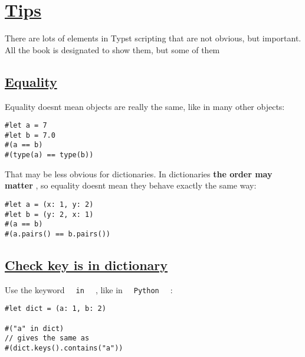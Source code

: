 \section{\texorpdfstring{\hyperref[tips]{Tips}}{Tips}}\label{tips}

There are lots of elements in Typst scripting that are not obvious, but
important. All the book is designated to show them, but some of them

\subsection{\texorpdfstring{\hyperref[equality]{Equality}}{Equality}}\label{equality}

Equality doesn\textquotesingle t mean objects are really the same, like
in many other objects:

\begin{verbatim}
#let a = 7
#let b = 7.0
#(a == b)
#(type(a) == type(b))
\end{verbatim}

\pandocbounded{}

That may be less obvious for dictionaries. In dictionaries \textbf{the
order may matter} , so equality doesn\textquotesingle t mean they behave
exactly the same way:

\begin{verbatim}
#let a = (x: 1, y: 2)
#let b = (y: 2, x: 1)
#(a == b)
#(a.pairs() == b.pairs())
\end{verbatim}

\pandocbounded{}

\subsection{\texorpdfstring{\hyperref[check-key-is-in-dictionary]{Check
key is in
dictionary}}{Check key is in dictionary}}\label{check-key-is-in-dictionary}

Use the keyword \texttt{\ }{\texttt{\ in\ }}\texttt{\ } , like in
\texttt{\ }{\texttt{\ Python\ }}\texttt{\ } :

\begin{verbatim}
#let dict = (a: 1, b: 2)

#("a" in dict)
// gives the same as
#(dict.keys().contains("a"))
\end{verbatim}

